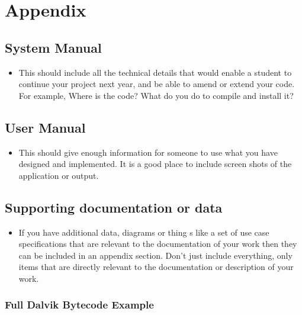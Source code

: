 \section{Appendix}
\label{sec:appendix}


\subsection{System Manual}

\begin{mdframed}
	\begin{itemize}
		\item This should include all the technical details that would enable a student to continue your project next year, and be able to amend or extend your code. For example, Where is the code? What do you do to compile and install it?
	\end{itemize}
\end{mdframed}

\subsection{User Manual}

\begin{mdframed}
	\begin{itemize}
		\item This should give enough information for someone to use what you have designed and implemented. It is a good place to include screen shots of the application or output.
	\end{itemize}
\end{mdframed}

\subsection{Supporting documentation or data}

\begin{mdframed}
	\begin{itemize}
		\item If you have additional data, diagrams or thing s like a set of use case specifications that are relevant to the documentation of your work then they can be included in an appendix section. Don't just include everything, only items that are directly relevant to the documentation or description of your work.
	\end{itemize}
\end{mdframed}

\subsubsection{Full Dalvik Bytecode Example}
\label{sec:sec:full_dalvik_bytecode_example}

